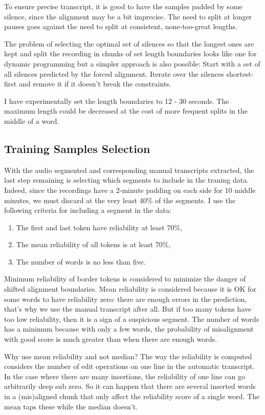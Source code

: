 \documentclass[runningheads,a4paper]{llncs}
\begin{document}
To ensure precise transcript, it is good to have the samples padded by some
silence, since the alignment may be a bit imprecise. The need to split at longer
pauses goes against the need to split at consistent, none-too-great lengths.

The problem of selecting the optimal set of silences so that the longest ones
are kept and split the recording in chunks of set length boundaries looks like
one for dynamic programming but a simpler approach is also possible: Start with a set of
all silences predicted by the forced alignment. Iterate over the silences
shortest-first and remove it if it doesn't break the constraints.

I have experimentally set the length boundaries to 12 - 30 seconds. The maximum
length could be decreased at the cost of more frequent splits in the middle of a
word.

\subsection{Training Samples Selection}

With the audio segmented and corresponding manual transcripts extracted, the
last step remaining is selecting which segments to include in the traning data.
Indeed, since the recordings have a 2-minute padding on each side for 10 middle
minutes, we must discard at the very least 40\% of the segments. I use the
following criteria for including a segment in the data:

\begin{enumerate}
\item{The first and last token have reliability at least 70\%,}
\item{The mean reliability of all tokens is at least 70\%,}
\item{The number of words is no less than five.}
\end{enumerate}

Minimum reliability of border tokens is considered to minimize the danger of
shifted alignment boundaries. Mean reliability is considered because it is OK for some
words to have reliability zero: there are enough errors in the prediction,
that's why we use the manual transcript after all. But if too many tokens have
too low reliability, then it is a sign of a suspicious segment. The number of
words has a minimum because with only a few words, the probability of
misalignment with good score is much greater than when there are enough words.

Why use mean reliability and not median? The way the reliability is computed
considers the number of edit operations on one line in the automatic transcript.
In the case where there are many insertions, the reliability of one line can go
arbitrarily deep sub zero. So it can happen that there are several inserted
words in a (mis)aligned chunk that only affect the reliability score of a single
word. The mean taps these while the median doesn't.
\end{document}
